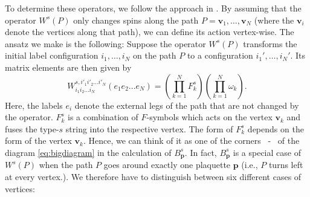To determine these operators, we follow the approach in \cite{Levin2005}. By assuming that the operator $W^s(P)$ only changes spins along the path $P=\mathbf{v}_1,\dots,\mathbf{v}_N$ (where the $\mathbf{v}_i$ denote the vertices along that path), we can define its action vertex-wise. The ansatz we make is the following: Suppose the operator $W^s(P)$ transforms the initial label configuration $i_1,\dots,i_N$ on the path $P$ to a configuration $i_1',\dots,i_N'$. Its matrix elements are then given by
	\begin{equation}
		W_{i_1 i_2...i_N}^{s,i'_1 i'_2...i'_N}(e_1 e_2...e_N)=\left(\prod_{k=1}^{N} F_k^s\right)\left(\prod_{k=1}^{N} \omega_k\right)\label{eq:StringOperator}.
	\end{equation}
Here, the labels $e_i$ denote the external legs of the path that are not changed by the operator. $F_k^s$ is a combination of $F$-symbols which acts on the vertex $\mathbf{v}_k$ and fuses the type-$s$ string into the respective vertex. The form of $F_k^s$ depends on the form of the vertex $\mathbf{v}_k$. Hence, we can think of it as one of the corners \itemone\ - \itemsix\ of the diagram \cref{eq:bigdiagram} in the calculation of $B_\mathbf{p}^s$. In fact, $B_\mathbf{p}^s$ is a special case of $W^s(P)$ when the path $P$ goes around exactly one plaquette $\mathbf{p}$ (i.e., $P$ turns left at every vertex.). We therefore have to distinguish between six different cases of vertices:
